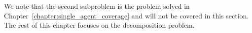 \documentclass[../main.tex]{subfiles}
\begin{document}
We note that the second subproblem is the problem solved in Chapter~\ref{chapter:single_agent_coverage} and will not be covered in this section. The rest of this chapter focuses on the decomposition problem.





\end{document}
